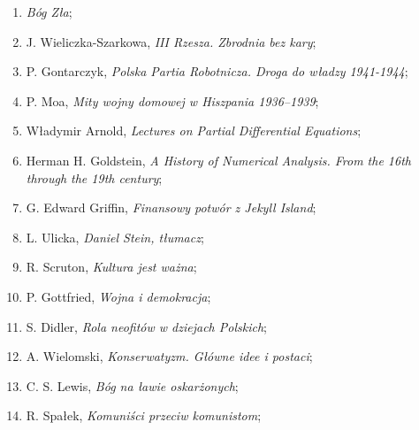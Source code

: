 \documentclass[a4paper,11pt]{article}
\begin{document}
\begin{enumerate}
\item \textit{Bóg Zła};



\item J. Wieliczka-Szarkowa, \textit{III Rzesza. Zbrodnia bez kary};



\item P. Gontarczyk, \textit{Polska Partia Robotnicza. Droga do władzy
    1941-1944};



\item P. Moa, \textit{Mity wojny domowej w Hiszpania 1936--1939};



\item Władymir Arnold, \textit{Lectures on Partial Differential
    Equations};



\item Herman H. Goldstein, \textit{A History of Numerical Analysis. From
    the 16th through the 19th century};



\item G. Edward Griffin, \textit{Finansowy potwór z Jekyll Island};



\item L. Ulicka, \textit{Daniel Stein, tłumacz};



\item R. Scruton, \textit{Kultura jest ważna};



\item P. Gottfried, \textit{Wojna i demokracja};



\item S. Didler, \textit{Rola neofitów w dziejach Polskich};



\item A. Wielomski, \textit{Konserwatyzm. Główne idee i postaci};



\item C. S. Lewis, \textit{Bóg na ławie oskarżonych};



\item R. Spałek, \textit{Komuniści przeciw komunistom};




\end{enumerate}
\end{document}
